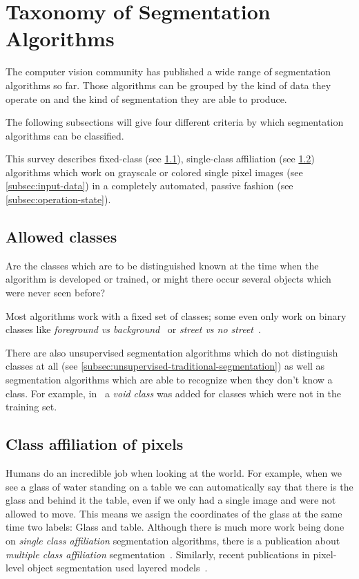 
\section{Taxonomy of Segmentation Algorithms}\label{sec:taxonomy}
The computer vision community has published a wide range of segmentation
algorithms so far. Those algorithms can be grouped by the kind of data they
operate on and the kind of segmentation they are able to produce.

The following subsections will give four different criteria by which
segmentation algorithms can be classified.

This survey describes fixed-class (see \cref{subsec:allowed-classes}),
single-class affiliation (see \cref{subsec:class-affiliation}) algorithms which
work on grayscale or colored single pixel images (see \cref{subsec:input-data})
in a completely automated, passive fashion (see \cref{subsec:operation-state}).

\subsection{Allowed classes}\label{subsec:allowed-classes}
Are the classes which are to be distinguished known at the time when the
algorithm is developed or trained, or might there occur several objects which
were never seen before?

Most algorithms work with a fixed set of classes; some even only work on binary
classes like \textit{foreground vs background}~\cite{4228537} or \textit{street
vs no street}~\cite{bittel2015pixel}.

There are also unsupervised segmentation algorithms which do not distinguish
classes at all (see \cref{subsec:unsupervised-traditional-segmentation}) as
well as segmentation algorithms which are able to recognize when they don't
know a class. For example, in~\cite{gould2008multi} a
\textit{void class} was added for classes which were not in the training set.


\subsection{Class affiliation of pixels}\label{subsec:class-affiliation}
Humans do an incredible job when looking at the world. For example, when we
see a glass of water standing on a table we can automatically say that there is
the glass and behind it the table, even if we only had a single image and were
not allowed to move. This means we assign the coordinates of the glass at the
same time two labels: Glass and table. Although there is much more work being
done on \textit{single class affiliation} segmentation algorithms, there is a
publication about \textit{multiple class affiliation}
segmentation~\cite{levin2008spectral}. Similarly, recent publications in
pixel-level object segmentation used layered models~\cite{yang2012layered}.


